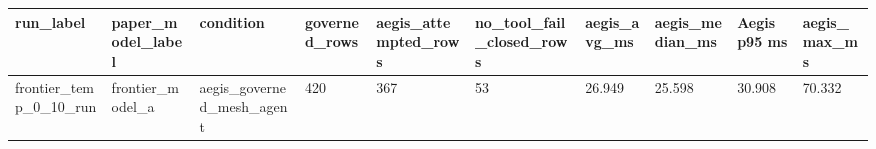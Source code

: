 \begin{tabular}{llllllllll}
 \hline
run\_label & paper\_model\_label & condition & governed\_rows & aegis\_attempted\_rows & no\_tool\_fail\_closed\_rows & aegis\_avg\_ms & aegis\_median\_ms & Aegis p95 ms & aegis\_max\_ms \\
 \hline
frontier\_temp\_0\_10\_run & frontier\_model\_a & aegis\_governed\_mesh\_agent & 420 & 367 & 53 & 26.949 & 25.598 & 30.908 & 70.332 \\
 \hline
\end{tabular}
